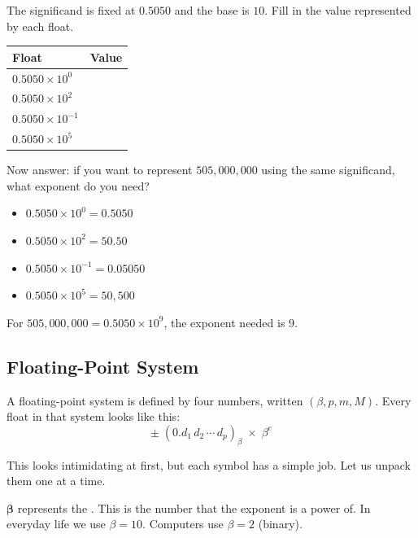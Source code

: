 \begin{Exercise}[title={The floating point in action}, label={ex:fp-float}]
  The significand is fixed at $0.5050$ and the base is $10$.
  Fill in the value represented by each float.

  \begin{center}
  \begin{tabular}{ll}
    \hline
    Float                    & Value \\
    \hline
    $0.5050 \times 10^{0}$   & \\[6pt]
    $0.5050 \times 10^{2}$   & \\[6pt]
    $0.5050 \times 10^{-1}$  & \\[6pt]
    $0.5050 \times 10^{5}$   & \\[6pt]
    \hline
  \end{tabular}
  \end{center}

  Now answer: if you want to represent $505{,}000{,}000$ using the same
  significand, what exponent do you need?
\end{Exercise}
\begin{Answer}[ref={ex:fp-float}]
  \begin{itemize}
    \item $0.5050 \times 10^{0} = 0.5050$
    \item $0.5050 \times 10^{2} = 50.50$
    \item $0.5050 \times 10^{-1} = 0.05050$
    \item $0.5050 \times 10^{5} = 50{,}500$
  \end{itemize}
  For $505{,}000{,}000 = 0.5050 \times 10^9$, the exponent needed is $9$.
\end{Answer}

\subsection{Floating-Point System}

A floating-point system is defined by four numbers, written $(\beta, p, m, M)$.
Every float in that system looks like this:
\[
  \pm \;(0.d_1\, d_2\, \cdots\, d_p)_\beta \;\times\; \beta^e
\]

This looks intimidating at first, but each symbol has a simple job.
Let us unpack them one at a time.

\medskip
$\boldsymbol{\beta}$  represents the .
This is the number that the exponent is a power of.
In everyday life we use $\beta = 10$.
Computers use $\beta = 2$ (binary).


